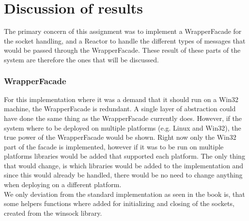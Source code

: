 \documentclass[Main]{subfiles}
\begin{document}
\chapter{Discussion of results}
The primary concern of this assignment was to implement a WrapperFacade for the socket handling, and a Reactor to handle the different types of messages that would be passed through the WrapperFacade.
These result of these parts of the system are therefore the ones that will be discussed.
\subsection{WrapperFacade}
For this implementation where it was a demand that it should run on a Win32 machine, the WrapperFacade is redundant.
A single layer of abstraction could have done the same thing as the WrapperFacade currently does.
However, if the system where to be deployed on multiple platforms (e.g. Linux and Win32), the true power of the WrapperFacade would be shown.
Right now only the Win32 part of the facade is implemented, however if it was to be run on multiple platforms libraries would be added that supported each platform. 
The only thing that would change, is which libraries would be added to the implementation and since this would already be handled, there would be no need to change anything when deploying on a different platform. \\
We only deviation from the standard implementation as seen in the book is, that some helpers functions where added for initializing and closing of the sockets, created from the winsock library.
\end{document}

